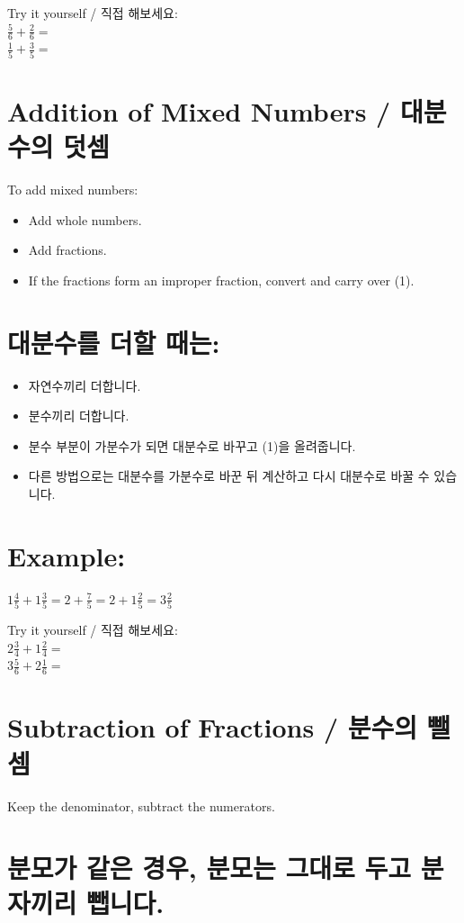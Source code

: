 \documentclass[10pt]{article}
\begin{document}
Try it yourself / 직접 해보세요:\\
$\frac{5}{6}+\frac{2}{6}=$\\
$\frac{1}{5}+\frac{3}{5}=$

\section*{Addition of Mixed Numbers / 대분수의 덧셈}
To add mixed numbers:

\begin{itemize}
  \item Add whole numbers.
  \item Add fractions.
  \item If the fractions form an improper fraction, convert and carry over (1).
\end{itemize}

\section*{대분수를 더할 때는:}
\begin{itemize}
  \item 자연수끼리 더합니다.
  \item 분수끼리 더합니다.
  \item 분수 부분이 가분수가 되면 대분수로 바꾸고 (1)을 올려줍니다.
  \item 다른 방법으로는 대분수를 가분수로 바꾼 뒤 계산하고 다시 대분수로 바꿀 수 있습니다.
\end{itemize}

\section*{Example:}
$1 \frac{4}{5}+1 \frac{3}{5}=2+\frac{7}{5}=2+1 \frac{2}{5}=3 \frac{2}{5}$

Try it yourself / 직접 해보세요:\\
$2 \frac{3}{4}+1 \frac{2}{4}=$\\
$3 \frac{5}{6}+2 \frac{1}{6}=$

\section*{Subtraction of Fractions / 분수의 뺄셈}
Keep the denominator, subtract the numerators.

\section*{분모가 같은 경우, 분모는 그대로 두고 분자끼리 뺍니다.}
\end{document}

